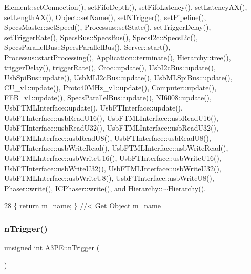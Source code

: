 Element\+::set\+Connection(), set\+Fifo\+Depth(), set\+Fifo\+Latency(), set\+Latency\+A\+X(), set\+Length\+A\+X(), Object\+::set\+Name(), set\+N\+Trigger(), set\+Pipeline(), Specs\+Master\+::set\+Speed(), Processus\+::set\+State(), set\+Trigger\+Delay(), set\+Trigger\+Rate(), Specs\+Bus\+::\+Specs\+Bus(), Specs\+I2c\+::\+Specs\+I2c(), Specs\+Parallel\+Bus\+::\+Specs\+Parallel\+Bus(), Server\+::start(), Processus\+::start\+Processing(), Application\+::terminate(), Hierarchy\+::tree(), trigger\+Delay(), trigger\+Rate(), Croc\+::update(), Usb\+I2c\+Bus\+::update(), Usb\+Spi\+Bus\+::update(), Usb\+M\+L\+I2c\+Bus\+::update(), Usb\+M\+L\+Spi\+Bus\+::update(), C\+U\+\_\+v1\+::update(), Proto40\+M\+Hz\+\_\+v1\+::update(), Computer\+::update(), F\+E\+B\+\_\+v1\+::update(), Specs\+Parallel\+Bus\+::update(), N\+I6008\+::update(), Usb\+F\+T\+M\+L\+Interface\+::update(), Usb\+F\+T\+Interface\+::update(), Usb\+F\+T\+Interface\+::usb\+Read\+U16(), Usb\+F\+T\+M\+L\+Interface\+::usb\+Read\+U16(), Usb\+F\+T\+Interface\+::usb\+Read\+U32(), Usb\+F\+T\+M\+L\+Interface\+::usb\+Read\+U32(), Usb\+F\+T\+M\+L\+Interface\+::usb\+Read\+U8(), Usb\+F\+T\+Interface\+::usb\+Read\+U8(), Usb\+F\+T\+Interface\+::usb\+Write\+Read(), Usb\+F\+T\+M\+L\+Interface\+::usb\+Write\+Read(), Usb\+F\+T\+M\+L\+Interface\+::usb\+Write\+U16(), Usb\+F\+T\+Interface\+::usb\+Write\+U16(), Usb\+F\+T\+Interface\+::usb\+Write\+U32(), Usb\+F\+T\+M\+L\+Interface\+::usb\+Write\+U32(), Usb\+F\+T\+M\+L\+Interface\+::usb\+Write\+U8(), Usb\+F\+T\+Interface\+::usb\+Write\+U8(), Phaser\+::write(), I\+C\+Phaser\+::write(), and Hierarchy\+::$\sim$\+Hierarchy().


\begin{DoxyCode}
28 \{ \textcolor{keywordflow}{return} \hyperlink{classObject_a8b83c95c705d2c3ba0d081fe1710f48d}{m\_name}; \} \textcolor{comment}{//< Get Object m\_name}
\end{DoxyCode}
\mbox{\label{classA3PE_a3398fa3ce59a4b1b946e7b4ab4912580}} 
\subsubsection{\texorpdfstring{n\+Trigger()}{nTrigger()}}
{\footnotesize\ttfamily unsigned int A3\+P\+E\+::n\+Trigger (\begin{DoxyParamCaption}{ }\end{DoxyParamCaption})}



